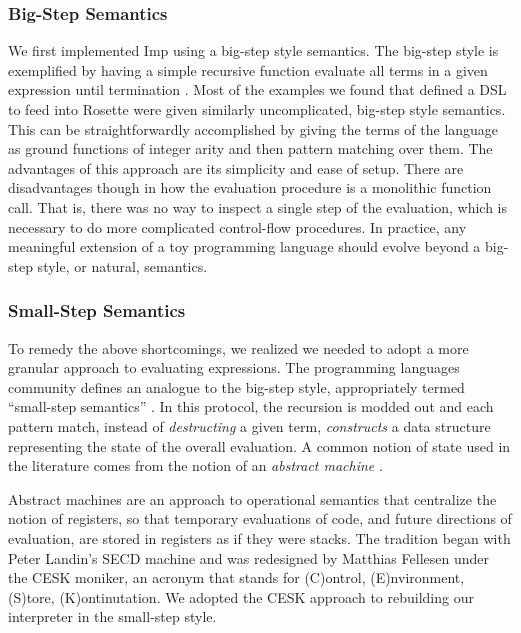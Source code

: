 \subsubsection{Big-Step Semantics}
We first implemented Imp using a big-step style semantics. The big-step style is exemplified by having a simple recursive function evaluate all terms in a given expression until termination \citep{huttel2010}.  Most of the examples we found that defined a DSL to feed into Rosette were given similarly uncomplicated, big-step style semantics.  This can be straightforwardly accomplished by giving the terms of the language as ground functions of integer arity and then pattern matching over them.  The advantages of this approach are its simplicity and ease of setup.  There are disadvantages though in how the evaluation procedure is a monolithic function call.  That is, there was no way to inspect a single step of the evaluation, which is necessary to do more complicated control-flow procedures.  In practice, any meaningful extension of a toy programming language should evolve beyond a big-step style, or natural, semantics.

\subsubsection{Small-Step Semantics}
To remedy the above shortcomings, we realized we needed to adopt a more granular approach to evaluating expressions.  The programming languages community defines an analogue to the big-step style, appropriately termed ``small-step semantics'' \citep{fernandez2004}.  In this protocol, the recursion is modded out and each pattern match, instead of \emph{destructing} a given term, \emph{constructs} a data structure representing the state of the overall evaluation.  A common notion of state used in the literature comes from the notion of an \emph{abstract machine} \citep{huttel2010}.

Abstract machines are an approach to operational semantics that centralize the notion of registers, so that temporary evaluations of code, and future directions of evaluation, are stored in registers as if they were stacks.   The tradition began with Peter Landin's SECD machine and was redesigned by Matthias Fellesen under the CESK moniker, an acronym that stands for (C)ontrol, (E)nvironment, (S)tore, (K)ontinutation.  We adopted the CESK approach to rebuilding our interpreter in the small-step style.

